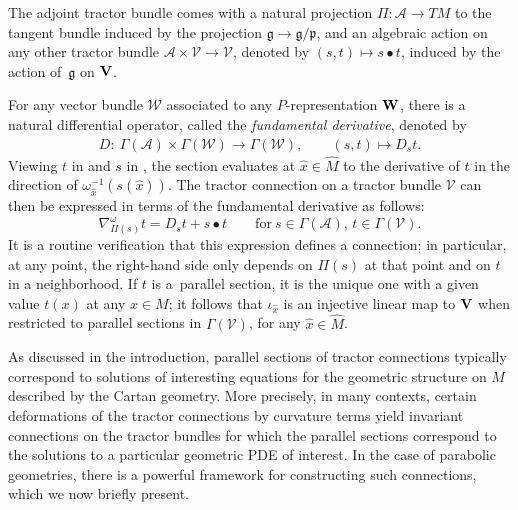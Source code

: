 \documentclass[10pt,a4paper]{amsart}
\numberwithin{equation}{section}
\theoremstyle{definition}
\def\g{{\mathfrak g}}
\def\p{{\mathfrak p}}
\begin{document}
The adjoint tractor bundle comes with a natural projection $\Pi\colon \mathcal A\rightarrow TM$ to the tangent bundle induced by the projection $\g \rightarrow \g/\p$,
and an algebraic action on any other tractor bundle $\mathcal A\times \mathcal V\rightarrow\mathcal V$, denoted by $(s,t)\mapsto s\bullet t$, induced by the action of~$\g$ on ${\bf V}$.

For any vector bundle $\mathcal W$ associated to any $P$-representation ${\bf W}$, there is a natural differential operator, called the \emph{fundamental derivative}, denoted by
 \begin{align*}
 D\colon\ \Gamma(\mathcal A)\times\Gamma(\mathcal W) \rightarrow \Gamma(\mathcal W),\qquad
(s,t) \mapsto D_st.
 \end{align*}
Viewing $t$ in  and $s$ in \smash{$C^\infty\bigl(\hat{M},\g\bigr)^P$}, the section  evaluates at $\hat{x} \in \hat{M}$ to the derivative of $t$ in the direction of $\omega_{\hat{x}}^{-1}(s(\hat{x}))$. The tractor connection on a tractor bundle $\mathcal V$ can then be expressed in terms of the fundamental derivative as follows:
\begin{equation}
\label{eqn.def.tractor.connxn}
\nabla_{\Pi(s)}^\omega t=D_st+s\bullet t\qquad \textrm{for}\ s\in \Gamma(\mathcal A),\, t\in\Gamma(\mathcal V).
\end{equation}
It is a routine verification that this expression defines a connection; in particular, at any point, the right-hand side only depends on $\Pi(s)$ at that point and on $t$ in a neighborhood. If $t$ is a~parallel section, it is the unique one with a given value $t(x)$ at any $x \in M$; it follows that $\iota_{\hat{x}}$ is an injective linear map to ${\bf V}$ when restricted to parallel sections in $\Gamma(\mathcal{V})$, for any $\hat{x} \in \hat{M}$.

As discussed in the introduction, parallel sections of tractor connections typically correspond to solutions of interesting equations for the geometric structure on $M$ described by the Cartan geometry. More precisely, in many contexts, certain deformations of the tractor connections by curvature terms yield invariant connections on the tractor bundles for which the parallel sections correspond to the solutions to a particular geometric PDE of interest.
 In the case of parabolic geometries, there is a powerful framework for constructing such connections, which we now briefly present.
\end{document}
